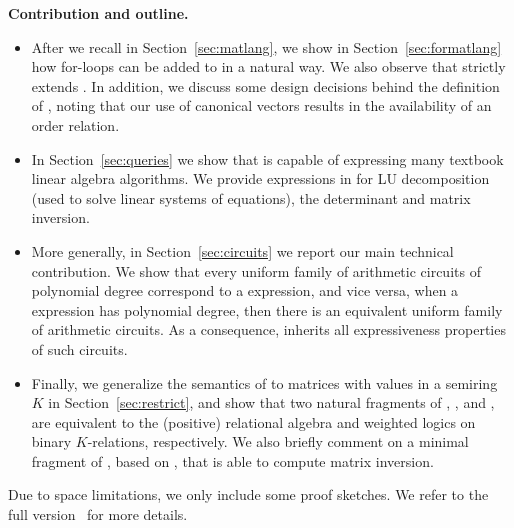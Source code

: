 \smallskip
\noindent
\textbf{Contribution and outline.} 
\begin{itemize}
	\item After we recall \lang in Section~\ref{sec:matlang}, we show in Section~\ref{sec:formatlang}
	how for-loops can be added to \lang in a natural way. We also observe that
	\langfor strictly extends \lang. In addition, we discuss some design decisions behind the definition of \langfor, noting that our use of canonical vectors results in the availability of an order relation.
	
	\item In Section~\ref{sec:queries} we show that \langfor 
is capable of expressing many textbook linear algebra algorithms. We provide expressions in \langfor for LU decomposition (used to solve linear systems of equations), the determinant and matrix inversion.
	\item More generally, in Section~\ref{sec:circuits} we report our main technical contribution.
	 We show that every uniform family of arithmetic circuits of polynomial degree correspond to a \langfor expression, and vice versa, when a \langfor expression has polynomial degree, then there is an equivalent uniform family of arithmetic circuits. As a consequence, \langfor inherits all expressiveness properties of such circuits.
	\item  Finally,  we generalize the semantics of \langfor to matrices with values in a semiring $K$  in Section~\ref{sec:restrict}, and show that two natural fragments of \langfor, \langsum, and \langprod, are equivalent to the (positive) relational algebra and weighted logics on binary $K$-relations, respectively. We also briefly comment on a minimal fragment of \langfor, based on \langmprod, that is able to compute matrix inversion.
\end{itemize}
Due to space limitations, we only include some proof sketches. We refer
to the full version~\cite{geerts2020expressive} for more details.

